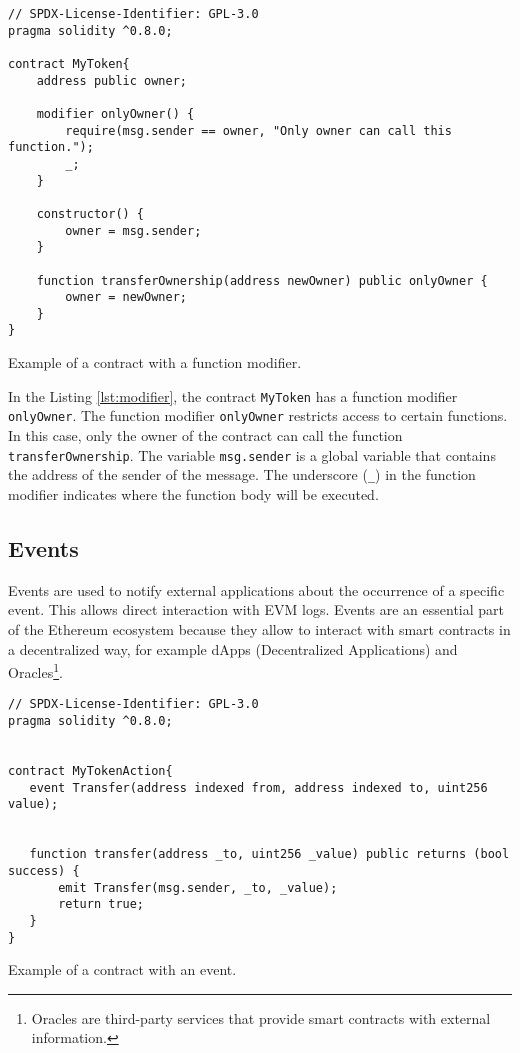 \begin{listing}[!ht]
    \begin{verbatim}
// SPDX-License-Identifier: GPL-3.0
pragma solidity ^0.8.0;

contract MyToken{
    address public owner;
    
    modifier onlyOwner() {
        require(msg.sender == owner, "Only owner can call this function.");
        _;
    }

    constructor() {
        owner = msg.sender;
    }

    function transferOwnership(address newOwner) public onlyOwner {
        owner = newOwner;
    }
}
    \end{verbatim}
    \caption{Example of a contract with a function modifier.}
    \label{lst:modifier}
\end{listing}


In the Listing \ref{lst:modifier}, the contract \texttt{MyToken} has a function modifier \texttt{onlyOwner}. The function modifier \texttt{onlyOwner} restricts
access to certain functions. In this case, only the owner of the contract can call the function \texttt{transferOwnership}.
The variable \texttt{msg.sender} is a global variable that contains the address of the sender of the message. The underscore (\texttt{\_}) in the function modifier
indicates where the function body will be executed.



\subsection{Events}

Events are used to notify external applications about the occurrence of a specific event. This allows direct interaction with EVM logs.
Events are an essential part of the Ethereum ecosystem because they allow to interact with smart contracts in a decentralized way, for example
dApps (Decentralized Applications) and Oracles\footnote{Oracles are third-party services that provide smart contracts with external information.}.

\begin{listing}[!ht]
   \begin{verbatim}
// SPDX-License-Identifier: GPL-3.0
pragma solidity ^0.8.0;


contract MyTokenAction{
   event Transfer(address indexed from, address indexed to, uint256 value);


   function transfer(address _to, uint256 _value) public returns (bool success) {
       emit Transfer(msg.sender, _to, _value);
       return true;
   }
}
   \end{verbatim}
   \caption{Example of a contract with an event.}
   \label{lst:event}
\end{listing}


